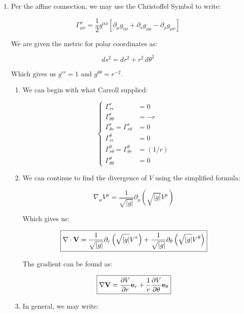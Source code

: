 \begin{enumerate}

  \item Per the affine connection, we may use the Christoffel Symbol to write:

    $$\Gamma^{\sigma}_{\mu\nu}=\frac{1}{2}g^{\alpha\rho}\left[ \partial_{\mu}g_{\nu\rho}+\partial_{\nu}g_{\rho\mu}-\partial_{\rho}g_{\mu\nu}  \right]$$

    We are given the metric for polar coordinates as:

    $$ds^2=dr^2+r^2\,d\theta^2$$

    Which gives us $g^{rr}=1$ and $g^{\theta\theta}=r^{-2}$.

    \begin{enumerate}

      \item 

        We can begin with what Carroll supplied:

        $$\boxed{\left\{\begin{array}{ll} \Gamma^r_{rr} &= 0\\\Gamma^r_{\theta\theta}&=-r\\\Gamma^r_{\theta r}=\Gamma^r_{r\theta}&= 0\\\Gamma^{\theta}_{rr}&= 0\\\Gamma^{\theta}_{r\theta}=\Gamma^{\theta}_{\theta r}&= (1/r)\\\Gamma^{\theta}_{\theta\theta}&= 0\end{array}}$$

      \item 

        We can continue to find the divergence of $V$ using the simplified formula:

        $$\nabla_{\mu}V^{\mu}=\frac{1}{\sqrt{|g|}}\partial_{\mu}\left( \sqrt{|g|}V^{\mu} \right)$$

        Which gives us:

        $$\boxed{\nabla\cdot\bold{V}=\frac{1}{\sqrt{|g|}}\partial_{r}\left( \sqrt{|g|}V^{r} \right)+\frac{1}{\sqrt{|g|}}\partial_{\theta}\left( \sqrt{|g|}V^{\theta} \right)}$$

        The gradient can be found as:

        $$\boxed{\nabla\bold{V}=\frac{\partial V}{\partial r}\bold{e}_r+\frac{1}{r}\frac{\partial V}{\partial \theta}\bold{e}_{\theta}}$$

      \item 

        In general, we may write:


\end{enumerate}
\end{enumerate}
